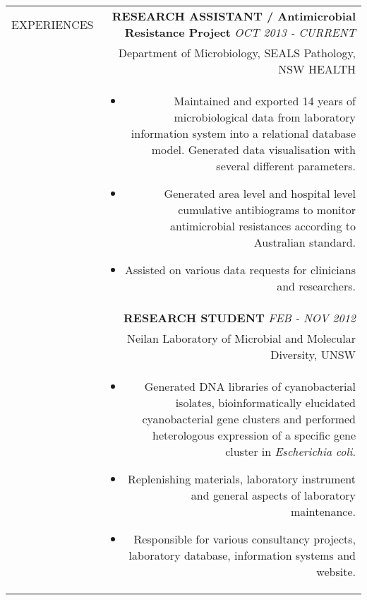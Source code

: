 \documentclass[a4paper,10pt]{article}
\newcommand\VRule{\color{lightgray}\vrule}
\newcommand\HRule{}
\begin{document}
\begin{tabular}{L!{\VRule}R}
\uppercase{Experiences} \HRule 
 & \textbf{\uppercase{Research Assistant} / Antimicrobial Resistance Project} \hfill\small \textit{OCT 2013 - CURRENT}\\
 & {Department of Microbiology, SEALS Pathology, NSW HEALTH} \\
 & \begin{itemize}
\item Maintained and exported 14 years of microbiological data from laboratory information system into a relational database model. Generated data visualisation with several different parameters.
\item Generated area level and hospital level cumulative antibiograms to monitor antimicrobial resistances according to Australian standard.
\item Assisted on various data requests for clinicians and researchers.
\end{itemize}\\


& \textbf{\uppercase{Research Student}} \hfill\small \textit{FEB - NOV 2012} \\
& Neilan Laboratory of Microbial and Molecular Diversity, UNSW\\
& \begin{itemize}
\item Generated DNA libraries of cyanobacterial isolates, bioinformatically elucidated cyanobacterial gene clusters and performed heterologous expression of a specific gene cluster in \textit{Escherichia coli}.
\item Replenishing materials, laboratory instrument and general aspects of laboratory maintenance.
\item Responsible for various consultancy projects, laboratory database, information systems and website.
\vspace{-.5cm}
\end{itemize}

\end{tabular}
\end{document}
